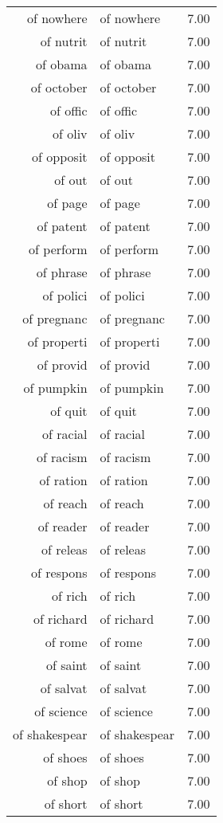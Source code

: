 \begin{table}[ht]
\begin{tabular}{rlr}
  of nowhere & of nowhere & 7.00 \\ 
  of nutrit & of nutrit & 7.00 \\ 
  of obama & of obama & 7.00 \\ 
  of october & of october & 7.00 \\ 
  of offic & of offic & 7.00 \\ 
  of oliv & of oliv & 7.00 \\ 
  of opposit & of opposit & 7.00 \\ 
  of out & of out & 7.00 \\ 
  of page & of page & 7.00 \\ 
  of patent & of patent & 7.00 \\ 
  of perform & of perform & 7.00 \\ 
  of phrase & of phrase & 7.00 \\ 
  of polici & of polici & 7.00 \\ 
  of pregnanc & of pregnanc & 7.00 \\ 
  of properti & of properti & 7.00 \\ 
  of provid & of provid & 7.00 \\ 
  of pumpkin & of pumpkin & 7.00 \\ 
  of quit & of quit & 7.00 \\ 
  of racial & of racial & 7.00 \\ 
  of racism & of racism & 7.00 \\ 
  of ration & of ration & 7.00 \\ 
  of reach & of reach & 7.00 \\ 
  of reader & of reader & 7.00 \\ 
  of releas & of releas & 7.00 \\ 
  of respons & of respons & 7.00 \\ 
  of rich & of rich & 7.00 \\ 
  of richard & of richard & 7.00 \\ 
  of rome & of rome & 7.00 \\ 
  of saint & of saint & 7.00 \\ 
  of salvat & of salvat & 7.00 \\ 
  of science & of science & 7.00 \\ 
  of shakespear & of shakespear & 7.00 \\ 
  of shoes & of shoes & 7.00 \\ 
  of shop & of shop & 7.00 \\ 
  of short & of short & 7.00 \\ 

\end{tabular}
\end{table}
